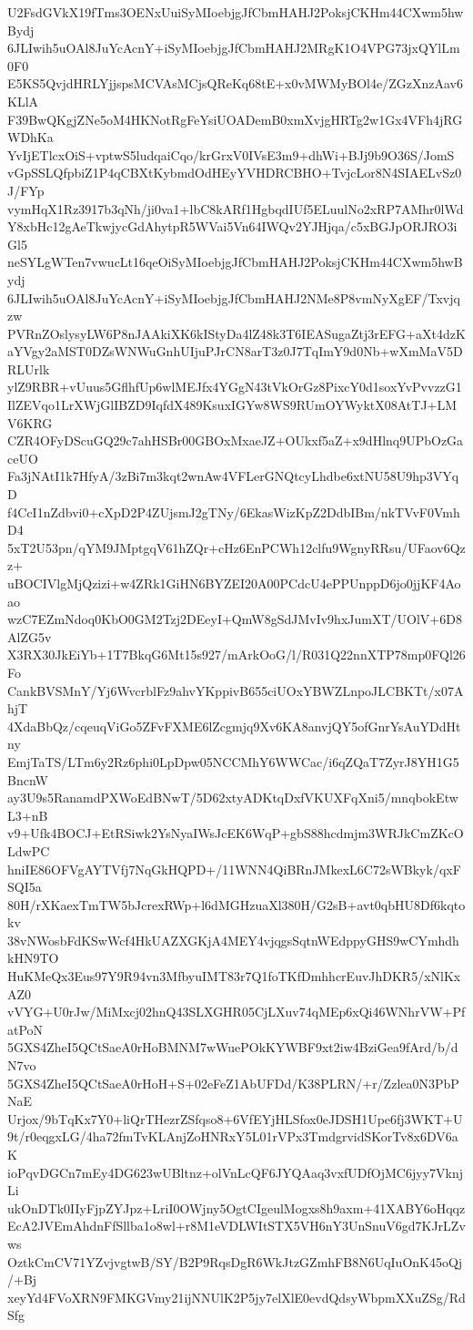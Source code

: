 U2FsdGVkX19fTms3OENxUuiSyMIoebjgJfCbmHAHJ2PoksjCKHm44CXwm5hwBydj
6JLIwih5uOAl8JuYcAcnY+iSyMIoebjgJfCbmHAHJ2MRgK1O4VPG73jxQYlLm0F0
E5KS5QvjdHRLYjjspsMCVAsMCjsQReKq68tE+x0vMWMyBOl4e/ZGzXnzAav6KLlA
F39BwQKgjZNe5oM4HKNotRgFeYsiUOADemB0xmXvjgHRTg2w1Gx4VFh4jRGWDhKa
YvIjETlcxOiS+vptwS5ludqaiCqo/krGrxV0IVsE3m9+dhWi+BJj9b9O36S/JomS
vGpSSLQfpbiZ1P4qCBXtKybmdOdHEyYVHDRCBHO+TvjcLor8N4SIAELvSz0J/FYp
vymHqX1Rz3917b3qNh/ji0va1+lbC8kARf1HgbqdIUf5ELuulNo2xRP7AMhr0lWd
Y8xbHc12gAeTkwjycGdAhytpR5WVai5Vn64IWQv2YJHjqa/c5xBGJpORJRO3iGl5
neSYLgWTen7vwucLt16qeOiSyMIoebjgJfCbmHAHJ2PoksjCKHm44CXwm5hwBydj
6JLIwih5uOAl8JuYcAcnY+iSyMIoebjgJfCbmHAHJ2NMe8P8vmNyXgEF/Txvjqzw
PVRnZOslysyLW6P8nJAAkiXK6kIStyDa4lZ48k3T6IEASugaZtj3rEFG+aXt4dzK
aYVgy2aMST0DZsWNWuGnhUIjuPJrCN8arT3z0J7TqImY9d0Nb+wXmMaV5DRLUrlk
ylZ9RBR+vUuus5GflhfUp6wlMEJfx4YGgN43tVkOrGz8PixcY0d1soxYvPvvzzG1
IlZEVqo1LrXWjGlIBZD9IqfdX489KsuxIGYw8WS9RUmOYWyktX08AtTJ+LMV6KRG
CZR4OFyDScuGQ29c7ahHSBr00GBOxMxaeJZ+OUkxf5aZ+x9dHlnq9UPbOzGaceUO
Fa3jNAtI1k7HfyA/3zBi7m3kqt2wnAw4VFLerGNQtcyLhdbe6xtNU58U9hp3VYqD
f4CcI1nZdbvi0+cXpD2P4ZUjsmJ2gTNy/6EkasWizKpZ2DdbIBm/nkTVvF0VmhD4
5xT2U53pn/qYM9JMptgqV61hZQr+cHz6EnPCWh12clfu9WgnyRRsu/UFaov6Qzz+
uBOCIVlgMjQzizi+w4ZRk1GiHN6BYZEI20A00PCdcU4ePPUnppD6jo0jjKF4Aoao
wzC7EZmNdoq0KbO0GM2Tzj2DEeyI+QmW8gSdJMvIv9hxJumXT/UOlV+6D8AlZG5v
X3RX30JkEiYb+1T7BkqG6Mt15s927/mArkOoG/l/R031Q22nnXTP78mp0FQl26Fo
CankBVSMnY/Yj6WvcrblFz9ahvYKppivB655ciUOxYBWZLnpoJLCBKTt/x07AhjT
4XdaBbQz/cqeuqViGo5ZFvFXME6lZcgmjq9Xv6KA8anvjQY5ofGnrYsAuYDdHtny
EmjTaTS/LTm6y2Rz6phi0LpDpw05NCCMhY6WWCac/i6qZQaT7ZyrJ8YH1G5BncnW
ay3U9s5RanamdPXWoEdBNwT/5D62xtyADKtqDxfVKUXFqXni5/mnqbokEtwL3+nB
v9+Ufk4BOCJ+EtRSiwk2YsNyaIWsJcEK6WqP+gbS88hcdmjm3WRJkCmZKcOLdwPC
hniIE86OFVgAYTVfj7NqGkHQPD+/11WNN4QiBRnJMkexL6C72sWBkyk/qxFSQI5a
80H/rXKaexTmTW5bJcrexRWp+l6dMGHzuaXl380H/G2sB+avt0qbHU8Df6kqtokv
38vNWosbFdKSwWcf4HkUAZXGKjA4MEY4vjqgsSqtnWEdppyGHS9wCYmhdhkHN9TO
HuKMeQx3Eus97Y9R94vn3MfbyuIMT83r7Q1foTKfDmhhcrEuvJhDKR5/xNlKxAZ0
vVYG+U0rJw/MiMxcj02hnQ43SLXGHR05CjLXuv74qMEp6xQi46WNhrVW+PfatPoN
5GXS4ZheI5QCtSaeA0rHoBMNM7wWuePOkKYWBF9xt2iw4BziGea9fArd/b/dN7vo
5GXS4ZheI5QCtSaeA0rHoH+S+02eFeZ1AbUFDd/K38PLRN/+r/Zzlea0N3PbPNaE
Urjox/9bTqKx7Y0+liQrTHezrZSfqso8+6VfEYjHLSfox0eJDSH1Upe6fj3WKT+U
9t/r0eqgxLG/4ha72fmTvKLAnjZoHNRxY5L01rVPx3TmdgrvidSKorTv8x6DV6aK
ioPqvDGCn7mEy4DG623wUBltnz+olVnLcQF6JYQAaq3vxfUDfOjMC6jyy7VknjLi
ukOnDTk0IIyFjpZYJpz+LriI0OWjny5OgtCIgeulMogxs8h9axm+41XABY6oHqqz
EcA2JVEmAhdnFfSllba1o8wl+r8M1eVDLWItSTX5VH6nY3UnSnuV6gd7KJrLZvws
OztkCmCV71YZvjvgtwB/SY/B2P9RqsDgR6WkJtzGZmhFB8N6UqIuOnK45oQj/+Bj
xeyYd4FVoXRN9FMKGVmy21ijNNUlK2P5jy7elXlE0evdQdsyWbpmXXuZSg/RdSfg
